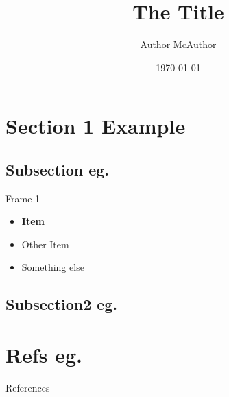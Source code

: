 \documentclass{beamer}
\title{The Title}
\date{\today}
\author[auth]{Author McAuthor}
\institute[inst]{Jedi Council}
\begin{document}
\begin{frame}
\titlepage
\end{frame}
\begin{frame}
    \tableofcontents    
\end{frame}
\section{Section 1 Example}

\subsection{Subsection eg.}
\begin{frame}{Frame 1}
    \begin{itemize}
        \item<2-> \textbf{Item}
        \item<3-> Other Item \cite{article}
        \item<4> Something else \cite{inbook}
    \end{itemize}
\end{frame}
\subsection{Subsection2 eg.}

\section{Refs eg.}
\begin{frame}[allowframebreaks]{References}
    
    
  
  \end{frame}
\end{document}
